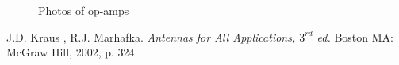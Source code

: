 \documentclass[12pt,a4paper]{report}
\begin{document}
\begin{figure}[htp]
    \begin{center}
    \end{center}
    \caption{Photos of op-amps}
    \label{fig:opamps}
\end{figure}

\begin{thebibliography}{99}

    J.D. Kraus , R.J. Marhafka.
    \textit{Antennas for All Applications, $3^{rd}$ ed.}
    Boston MA: McGraw Hill, 2002, p. 324.


\end{thebibliography}
    
\end{document}
